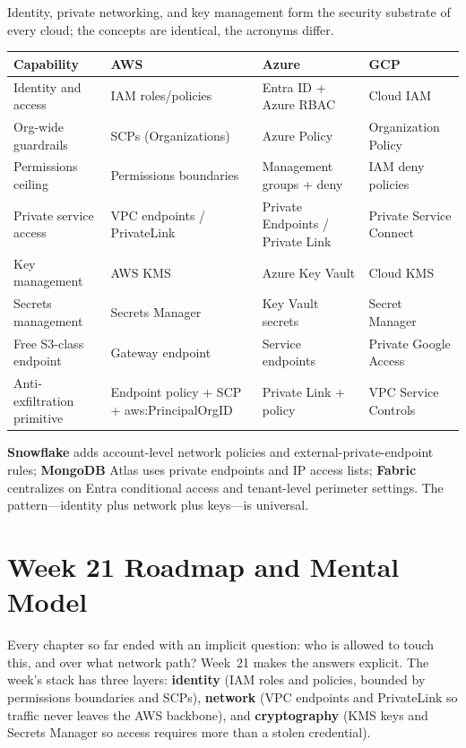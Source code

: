\begin{crosscloud}
Identity, private networking, and key management form the security substrate of every cloud; the concepts are identical, the acronyms differ.

\vspace{2mm}
{\footnotesize
\begin{tabular}{@{}p{2.8cm}p{3.0cm}p{3.0cm}p{3.0cm}@{}}
\toprule
\textbf{Capability} & \textbf{AWS} & \textbf{Azure} & \textbf{GCP} \\
\midrule
Identity and access & IAM roles/policies & Entra ID + Azure RBAC & Cloud IAM \\
Org-wide guardrails & SCPs (Organizations) & Azure Policy & Organization Policy \\
Permissions ceiling & Permissions boundaries & Management groups + deny & IAM deny policies \\
Private service access & VPC endpoints / PrivateLink & Private Endpoints / Private Link & Private Service Connect \\
Key management & AWS KMS & Azure Key Vault & Cloud KMS \\
Secrets management & Secrets Manager & Key Vault secrets & Secret Manager \\
\addlinespace
Free S3-class endpoint & Gateway endpoint & Service endpoints & Private Google Access \\
Anti-exfiltration primitive & Endpoint policy + SCP + aws:PrincipalOrgID & Private Link + policy & VPC Service Controls \\
\bottomrule
\end{tabular}}

\vspace{1mm}
\textbf{Snowflake} adds account-level network policies and external-private-endpoint rules; \textbf{MongoDB} Atlas uses private endpoints and IP access lists; \textbf{Fabric} centralizes on Entra conditional access and tenant-level perimeter settings. The pattern---identity plus network plus keys---is universal.
\end{crosscloud}

\section{Week 21 Roadmap and Mental Model}
Every chapter so far ended with an implicit question: who is allowed to touch this, and over what network path? Week~21 makes the answers explicit. The week's stack has three layers: \textbf{identity} (IAM roles and policies, bounded by permissions boundaries and SCPs), \textbf{network} (VPC endpoints and PrivateLink so traffic never leaves the AWS backbone), and \textbf{cryptography} (KMS keys and Secrets Manager so access requires more than a stolen credential).


